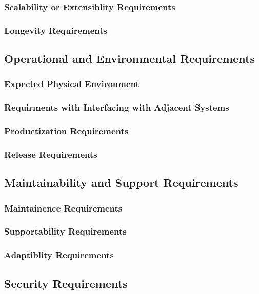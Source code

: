 \documentclass{article}
\begin{document}
\subsubsection{Scalability or Extensiblity Requirements}
\subsubsection{Longevity Requirements}

\subsection{Operational and Environmental Requirements}
\subsubsection{Expected Physical Environment}
\subsubsection{Requirments with Interfacing with Adjacent Systems}
\subsubsection{Productization Requirements}
\subsubsection{Release Requirements}

\subsection{Maintainability and Support Requirements}
\subsubsection{Maintainence Requirements}
\subsubsection{Supportability Requirements}
\subsubsection{Adaptiblity Requirements}

\subsection{Security Requirements}
\end{document}
